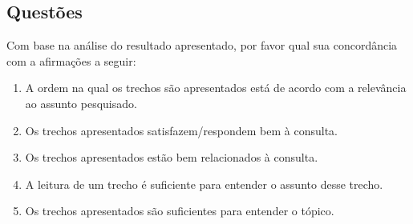 \newpage

\subsection*{Questões}

Com base na análise do resultado apresentado, por favor qual sua concordância com a afirmações a seguir:

\begin{enumerate}

\item A ordem na qual os trechos são apresentados está de acordo com a relevância ao assunto pesquisado.
\likert

\item Os trechos apresentados satisfazem/respondem bem à consulta.
\likert

\item Os trechos apresentados estão bem relacionados à consulta.
\likert

\item A leitura de um trecho é suficiente para entender o assunto desse trecho.
\likert

\item Os trechos apresentados são suficientes para entender o tópico.
\likert

\end{enumerate}





%
%
%
%
%
















